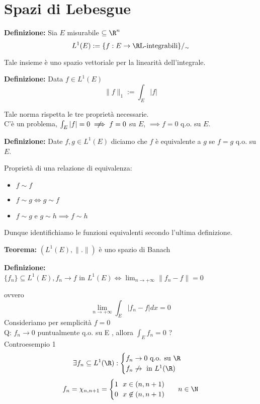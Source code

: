 
\section{Spazi di Lebesgue}
\begin{tcolorbox}
	\textbf{Definizione: }Sia  $E$  misurabile  $\subseteq\R^n$ 
	  \[L^1(E):= \{f:E\to  \R    \text{L-integrabili} \} /_{\sim}\]  
\end{tcolorbox}
Tale insieme è uno spazio vettoriale per la linearità dell'integrale.
\begin{tcolorbox}
	\textbf{Definizione: }Data  $f \in  L ^1(E)$ 
  \[\|f\|_1:=\int_{E}^{} |f|\]  
\end{tcolorbox}
Tale norma rispetta le tre proprietà necessarie.
\\C'è un problema,  $\int_{E}^{} |f|=0\centernot\implies f=0$  su $E$,  $\implies f=0$  q.o. su  $E$.
\begin{tcolorbox}
	\textbf{Definizione: }Date  $f,g\in  L ^1(E)$  diciamo che  $f$  è equivalente a  $g$  se  $f=g$  q.o. su  $E$.
\end{tcolorbox}
Proprietà di una relazione di equivalenza:
\begin{itemize}
	\item $f\sim f$ 
	\item $f\sim g \iff g\sim f$ 
	\item $ f\sim g$ e $g\sim h\implies f\sim h$ 
\end{itemize}
Dunque identifichiamo le funzioni equivalenti secondo l'ultima definizione.
\begin{tcolorbox}
	\textbf{Teorema: }$(L^1(E),\|.\|)$  è uno spazio di Banach
\end{tcolorbox}
\begin{tcolorbox}
	\textbf{Definizione: }\\$\{f_n\} \subseteq L^1(E),f_n\to f$ in $L^1(E) \iff \lim_{n \to +\infty} \|f_n-f\|=0$ 
\end{tcolorbox}
ovvero
\[\lim_{n\to +\infty} \int_{E}^{} |f_n-f|dx=0\] 
Consideriamo per semplicità  $f=0$ 
\\Q: $f_n\to  0$  puntualmente q.o. su  E , allora  $\int_{E}^{} f_n=0$ ? 
\\Controesempio 1
\[\exists f_n\subseteq  L^1(\R): \begin{cases}
	f_n\to 0\text{ q.o. su } \R\\
	f_n \not\to \text{ in }L^1(\R)
\end{cases}
\]
\[f_n=\chi_{n, n+1}=\begin{cases}
	1\ \ x\in(n,n+1)
	\\0\ \ x \not\in (n,n+1)
\end{cases}\ \ n\in \N
\]
